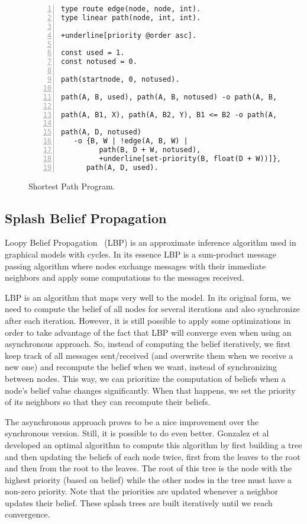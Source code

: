 \begin{figure}[h!]
\small\begin{Verbatim}[numbers=left,commandchars=+\[\]]
type route edge(node, node, int).
type linear path(node, int, int).

+underline[priority @order asc].

const used = 1.
const notused = 0.

path(startnode, 0, notused).

path(A, B, used), path(A, B, notused) -o path(A, B, used).

path(A, B1, X), path(A, B2, Y), B1 <= B2 -o path(A, B1, X).

path(A, D, notused)
   -o {B, W | !edge(A, B, W) |
         path(B, D + W, notused),
         +underline[set-priority(B, float(D + W))]},
      path(A, D, used).
\end{Verbatim}
  \caption{Shortest Path Program.}
  \label{code:shortest_path_program}
\end{figure}
\normalsize

\subsection{Splash Belief Propagation}

Loopy Belief Propagation~\cite{Murphy99loopybelief} (LBP) is an approximate inference algorithm
used in graphical models with cycles. In its essence LBP is a sum-product message passing algorithm
where nodes exchange messages with their immediate neighbors and apply some computations to the messages
received.

LBP is an algorithm that maps very well to the \lang model. In its original form, we need to compute
the belief of all nodes for several iterations and also synchronize after each iteration.
However, it is still possible to apply
some optimizations in order to take advantage of the fact that LBP will converge even when using
an asynchronous approach. So, instead of computing the belief iteratively,
we first keep track of all messages sent/received (and overwrite them when we receive a new one)
and recompute the belief when we want, instead of synchronizing between nodes.
This way, we can prioritize the computation of beliefs when
a node's belief value changes significantly. When that happens, we set the priority of its
neighbors so that they can recompute their beliefs.

The asynchronous approach proves to be a nice improvement over the synchronous version. Still, it
is possible to do even better. Gonzalez et al~\cite{Gonzalez+al:aistats09paraml} developed an optimal
algorithm to compute this algorithm by first building a tree and then updating the beliefs of each node twice, first from the leaves to the root and then from the root to the leaves. The root of this tree
is the node with the highest priority (based on belief) while the other nodes in the tree
must have a non-zero priority. Note that the priorities are updated whenever a neighbor updates
their belief. These splash trees are built iteratively until we reach convergence.

